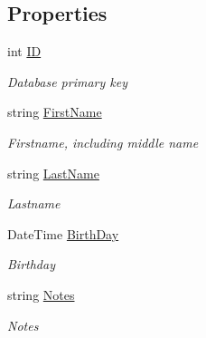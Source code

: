 \subsection*{Properties}
\begin{DoxyCompactItemize}
\item 
int \mbox{\hyperlink{class_pic_d_b_1_1_view_models_1_1_photographer_view_model_a3c43e165352f1ba95d5ef61965e4f889}{ID}}
\begin{DoxyCompactList}\small\item\em Database primary key \end{DoxyCompactList}\item 
string \mbox{\hyperlink{class_pic_d_b_1_1_view_models_1_1_photographer_view_model_afe291a57c4277703a7ffe8a856d08cb2}{First\+Name}}
\begin{DoxyCompactList}\small\item\em Firstname, including middle name \end{DoxyCompactList}\item 
string \mbox{\hyperlink{class_pic_d_b_1_1_view_models_1_1_photographer_view_model_a92b49fb0cd30335998b29899f7e9dc3c}{Last\+Name}}
\begin{DoxyCompactList}\small\item\em Lastname \end{DoxyCompactList}\item 
Date\+Time \mbox{\hyperlink{class_pic_d_b_1_1_view_models_1_1_photographer_view_model_a272cf8a62675429fc53d4dc9d08e9200}{Birth\+Day}}
\begin{DoxyCompactList}\small\item\em Birthday \end{DoxyCompactList}\item 
string \mbox{\hyperlink{class_pic_d_b_1_1_view_models_1_1_photographer_view_model_ae6ea10b7c8cb367cebcbe321988ba7ea}{Notes}}
\begin{DoxyCompactList}\small\item\em Notes \end{DoxyCompactList}\item 

\end{DoxyCompactItemize}
